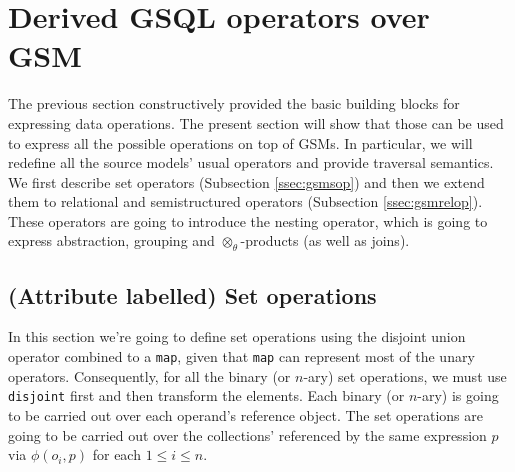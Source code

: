 
\section{Derived GSQL operators over GSM}
The previous section constructively provided the basic building blocks for expressing data operations. The present section will show that those 
can be used to express all the possible operations on top of GSMs.
In particular, we will
 redefine all the source models' usual operators and provide traversal semantics. We first describe  set operators  (Subsection \vref{ssec:gsmsop}) and then we extend them to relational and semistructured operators (Subsection \vref{ssec:gsmrelop}). %
These operators are going to introduce the nesting operator, which is going to express abstraction, grouping and $\otimes_\theta$-products (as well as joins).

\subsection{(Attribute labelled) Set operations}\label{ssec:gsmsop}
In this section we're going to define set operations using the disjoint union operator combined to a \texttt{map}, given that \texttt{map} can represent most of the unary operators. Consequently, for all the binary (or $n$-ary) set operations, we must use \texttt{disjoint} first and then transform the elements. Each binary (or $n$-ary) is going to be carried out over  each operand's reference object. The set operations are going to be carried out over the collections' referenced by the same expression $p$ via $\phi(o_i,p)$ for each $1\leq i\leq n$.

